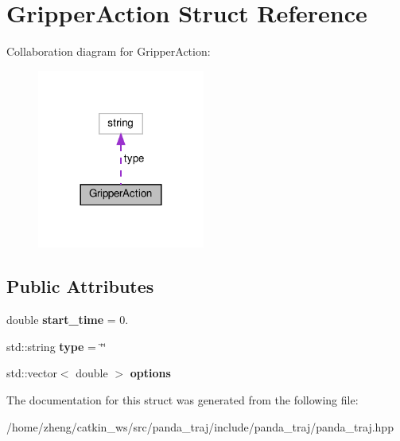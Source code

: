 \hypertarget{struct_gripper_action}{}\section{Gripper\+Action Struct Reference}
\label{struct_gripper_action}


Collaboration diagram for Gripper\+Action\+:
\nopagebreak
\begin{figure}[H]
\begin{center}
\leavevmode
\includegraphics[width=156pt]{struct_gripper_action__coll__graph}
\end{center}
\end{figure}
\subsection*{Public Attributes}
\begin{DoxyCompactItemize}
\item 
\mbox{\label{struct_gripper_action_afba49e4ebd8ad1f0391f645e045f01e4}} 
double {\bfseries start\+\_\+time} = 0.
\item 
\mbox{\label{struct_gripper_action_a071f257ddb354fa667a1bef2d9febbc6}} 
std\+::string {\bfseries type} = \char`\"{}\char`\"{}
\item 
\mbox{\label{struct_gripper_action_afd155b4e1abe1423a16bf07cce158773}} 
std\+::vector$<$ double $>$ {\bfseries options}
\end{DoxyCompactItemize}


The documentation for this struct was generated from the following file\+:\begin{DoxyCompactItemize}
\item 
/home/zheng/catkin\+\_\+ws/src/panda\+\_\+traj/include/panda\+\_\+traj/panda\+\_\+traj.\+hpp\end{DoxyCompactItemize}
